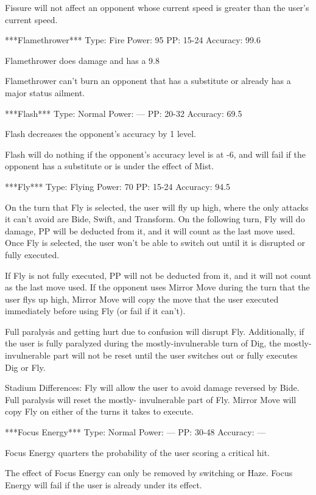 \documentclass[reprint, aps, prl, paper=A4]{revtex4-1}
\begin{document}
Fissure will not affect an opponent whose current speed is greater than the user's current speed.


***Flamethrower***
Type: Fire
Power: 95
PP: 15-24
Accuracy: 99.6%

Flamethrower does damage and has a 9.8%

Flamethrower can't burn an opponent that has a substitute or already has a major status
ailment.


***Flash***
Type: Normal
Power: ---
PP: 20-32
Accuracy: 69.5%

Flash decreases the opponent's accuracy by 1 level.

Flash will do nothing if the opponent's accuracy level is at -6, and will fail if the opponent
has a substitute or is under the effect of Mist.


***Fly***
Type: Flying
Power: 70
PP: 15-24
Accuracy: 94.5%

On the turn that Fly is selected, the user will fly up high, where the only attacks it can't
avoid are Bide, Swift, and Transform. On the following turn, Fly will do damage, PP will be
deducted from it, and it will count as the last move used. Once Fly is selected, the user won't
be able to switch out until it is disrupted or fully executed.

If Fly is not fully executed, PP will not be deducted from it, and it will not count as the
last move used. If the opponent uses Mirror Move during the turn that the user flys up high,
Mirror Move will copy the move that the user executed immediately before using Fly (or fail if
it can't).

Full paralysis and getting hurt due to confusion will disrupt Fly. Additionally, if the user is
fully paralyzed during the mostly-invulnerable turn of Dig, the mostly-invulnerable part will
not be reset until the user switches out or fully executes Dig or Fly.

Stadium Differences:
Fly will allow the user to avoid damage reversed by Bide. Full paralysis will reset the mostly-
invulnerable part of Fly. Mirror Move will copy Fly on either of the turns it takes to execute.


***Focus Energy***
Type: Normal
Power: ---
PP: 30-48
Accuracy: ---

Focus Energy quarters the probability of the user scoring a critical hit.

The effect of Focus Energy can only be removed by switching or Haze. Focus Energy will fail if
the user is already under its effect.
\end{document}

